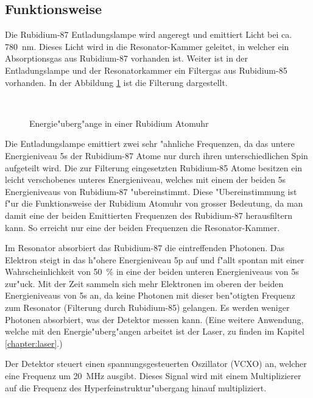 \begin{refsection}
\subsection{Funktionsweise}
Die Rubidium-87 Entladungslampe wird angeregt und emittiert Licht bei
ca. \SI{780}{\nano\meter}.  Dieses Licht wird in die Resonator-Kammer
geleitet, in welcher ein Absorptionsgas aus Rubidium-87 vorhanden ist.
Weiter ist in der Entladungslampe und der Resonatorkammer ein
Filtergas aus Rubidium-85 vorhanden.  In der Abbildung
\ref{fig:uebergaenge} ist die Filterung dargestellt.

\begin{figure}
  \centering
  \\
  \caption{Energie"uberg"ange in einer Rubidium Atomuhr}
  \label{fig:uebergaenge}
\end{figure}


Die Entladungslampe emittiert zwei sehr "ahnliche Frequenzen, da das
untere Energieniveau 5s der Rubidium-87 Atome nur durch ihren
unterschiedlichen Spin aufgeteilt wird.  Die zur Filterung
eingesetzten Rubidium-85 Atome besitzen ein leicht verschobenes
unteres Energieniveau, welches mit einem der beiden 5s Energieniveaus
von Rubidium-87 "ubereinstimmt.  Diese "Ubereinstimmung ist f"ur die
Funktionsweise der Rubidium Atomuhr von grosser Bedeutung, da man
damit eine der beiden Emittierten Frequenzen des Rubidium-87
herausfiltern kann.  So erreicht nur eine der beiden Frequenzen die
Resonator-Kammer.

Im Resonator absorbiert das Rubidium-87 die eintreffenden
Photonen. Das Elektron steigt in das h"ohere Energieniveau 5p auf und
f"allt spontan mit einer Wahrscheinlichkeit von \SI{50}{\percent} in
eine der beiden unteren Energieniveaus von 5s zur"uck.  Mit der Zeit
sammeln sich mehr Elektronen im oberen der beiden Energieniveaus von
5s an, da keine Photonen mit dieser ben"otigten Frequenz zum Resonator
(Filterung durch Rubidium-85) gelangen.  Es werden weniger Photonen
absorbiert, was der Detektor messen kann.  (Eine weitere Anwendung,
welche mit den Energie"uberg"angen arbeitet ist der Laser, zu finden
im Kapitel \ref{chapter:laser}.)

Der Detektor steuert einen spannungsgesteuerten Oszillator (VCXO) an,
welcher eine Frequenz um \SI{20}{\mega\hertz} ausgibt.  Dieses Signal
wird mit einem Multiplizierer auf die Frequenz des
Hyperfeinstruktur"ubergang hinauf multipliziert.


\end{refsection}
